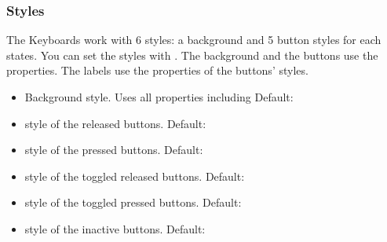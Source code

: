 \documentclass[letterpaper,10pt,english]{sphinxmanual}
\begin{document}
\subsubsection{Styles}
\label{\detokenize{object-types/kb:styles}}
The Keyboards work with 6 styles: a background and 5 button styles for each states.
You can set the styles with .
The background and the buttons use the  properties.
The labels use the  properties of the buttons’ styles.
\begin{itemize}
\item {} 
 Background style. Uses all  properties including  Default: 

\item {} 
 style of the released  buttons. Default: 

\item {} 
 style of the pressed buttons. Default: 

\item {} 
 style of the toggled released  buttons. Default: 

\item {} 
 style of the toggled pressed  buttons. Default: 

\item {} 
 style of the inactive  buttons. Default: 

\end{itemize}
\end{document}
